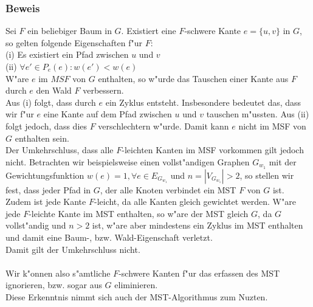 \subsubsection{Beweis}
\label{sec:fProof}

Sei $F$ ein beliebiger Baum in $G$.
    Existiert eine $F$-schwere Kante $e=\{u, v\}$ in $G$, so gelten folgende 
    Eigenschaften f"ur $F$:\\
(i) Es existiert ein Pfad zwischen $u$ und $v$\\
(ii) $\forall e' \in P_e(e) : w(e') < w(e)$\\
W"are $e$ im $MSF$ von $G$ enthalten, so w"urde das Tauschen einer Kante aus
    $F$ durch $e$ den Wald $F$ verbessern.\\
Aus (i) folgt, dass durch $e$ ein Zyklus entsteht. Insbesondere bedeutet das, 
    dass wir f"ur $e$ eine Kante auf dem Pfad zwischen $u$ und $v$ tauschen
    m"ussten.
    Aus (ii) folgt jedoch, dass dies $F$ verschlechtern w"urde.
    Damit kann $e$ nicht im MSF von $G$ enthalten sein.\\
Der Umkehrschluss, dass alle $F$-leichten Kanten im MSF vorkommen gilt jedoch
    nicht.
    Betrachten wir beispielsweise einen vollst"andigen Graphen $G_{w_1}$ mit der 
    Gewichtungsfunktion $w(e) = 1, \forall e \in E_{G_{w_1}}$ und 
    $n = |V_{G_{w_1}}| > 2$, so stellen wir fest, dass jeder Pfad in $G$, der alle
    Knoten verbindet ein MST $F$ von $G$ ist.
    Zudem ist jede Kante $F$-leicht, da alle Kanten gleich gewichtet werden.
    W"are jede $F$-leichte Kante im MST enthalten, so w"are der MST gleich $G$,
    da $G$ vollst"andig und $n > 2$ ist, w"are aber mindestens ein Zyklus im 
    MST enthalten und damit eine Baum-, bzw. Wald-Eigenschaft verletzt.\\
    Damit gilt der Umkehrschluss nicht.\\
\\
Wir k"onnen also s"amtliche $F$-schwere Kanten f"ur das erfassen des MST 
    ignorieren, bzw. sogar aus $G$ eliminieren.\\
Diese Erkenntnis nimmt sich auch der MST-Algorithmus zum Nuzten.\\

